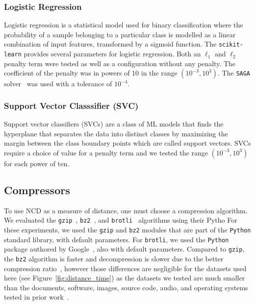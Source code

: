\documentclass[preprint,12pt]{article}
\begin{document}
\subsubsection{Logistic Regression}
Logistic regression is a statistical model used for binary classification where the probability of a sample belonging to a particular class is modelled as a linear combination of input features, transformed by a sigmoid function.
The \texttt{scikit-learn} provides several parameters for logistic regression. 
Both an $\ell_1$ and $\ell_2$ penalty term were tested as well as a configuration without any penalty. The coefficient of the penalty was in powers of 10 in the range $(10^{-3}, 10^3)$.
The \texttt{SAGA} solver~\cite{saga} was used with a tolerance of $10^{-4}$.


\subsubsection{Support Vector Classsifier (SVC)}
Support vector classifiers (SVCs) are a class of ML models that finds the hyperplane that separates the data into distinct classes by maximizing the margin between the class boundary points which are called support vectors.
SVCs require a choice of value for a penalty term and we tested the range $(10^{-3}, 10^3)$ for each power of ten.










\subsection{Compressors}
\label{compressors}

To use NCD as a measure of distance, one must choose a compression algorithm.
We evaluated the \texttt{gzip}~\cite{gzip}, \texttt{bz2}~\cite{bz2}, and \texttt{brotli}~\cite{brotli_package} algorithms using their Pytho
For these experiments, we used the \texttt{gzip} and \texttt{bz2} modules that are part of the \texttt{Python} standard library, with default parameters.
For \texttt{brotli}, we used the \texttt{Python} package authored by Google~\cite{brotli_package}, also with default parameters.
Compared to \texttt{gzip}, the \texttt{bz2} algorithm is faster and decompression is slower due to the better compression ratio~\cite{bz2_comparison}, however those differences are negligible for the datasets used here (see Figure~\ref{fig:distance_time}) as the datasets we tested are much smaller than the documents, software, images, source code, audio, and operating systems tested in prior work~\cite{bz2_comparison}.
\end{document}
